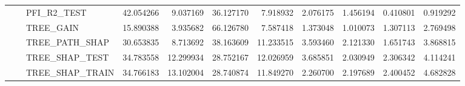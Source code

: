 \begin{table}
\begin{tabular}{lllrrrrrrrr}
 &  & PFI\_R2\_TEST & {\cellcolor[HTML]{B40426}} \color[HTML]{F1F1F1} 42.054266 & {\cellcolor[HTML]{7EA1FA}} \color[HTML]{F1F1F1} 9.037169 & {\cellcolor[HTML]{E26952}} \color[HTML]{F1F1F1} 36.127170 & {\cellcolor[HTML]{7597F6}} \color[HTML]{F1F1F1} 7.918932 & {\cellcolor[HTML]{465ECF}} \color[HTML]{F1F1F1} 2.076175 & {\cellcolor[HTML]{4257C9}} \color[HTML]{F1F1F1} 1.456194 & {\cellcolor[HTML]{3B4CC0}} \color[HTML]{F1F1F1} 0.410801 & {\cellcolor[HTML]{3E51C5}} \color[HTML]{F1F1F1} 0.919292 \\
 &  & TREE\_GAIN & {\cellcolor[HTML]{85A8FC}} \color[HTML]{F1F1F1} 15.890388 & {\cellcolor[HTML]{485FD1}} \color[HTML]{F1F1F1} 3.935682 & {\cellcolor[HTML]{B40426}} \color[HTML]{F1F1F1} 66.126780 & {\cellcolor[HTML]{5977E3}} \color[HTML]{F1F1F1} 7.587418 & {\cellcolor[HTML]{3C4EC2}} \color[HTML]{F1F1F1} 1.373048 & {\cellcolor[HTML]{3B4CC0}} \color[HTML]{F1F1F1} 1.010073 & {\cellcolor[HTML]{3C4EC2}} \color[HTML]{F1F1F1} 1.307113 & {\cellcolor[HTML]{4257C9}} \color[HTML]{F1F1F1} 2.769498 \\
 &  & TREE\_PATH\_SHAP & {\cellcolor[HTML]{EE8669}} \color[HTML]{F1F1F1} 30.653835 & {\cellcolor[HTML]{799CF8}} \color[HTML]{F1F1F1} 8.713692 & {\cellcolor[HTML]{B40426}} \color[HTML]{F1F1F1} 38.163609 & {\cellcolor[HTML]{92B4FE}} \color[HTML]{000000} 11.233515 & {\cellcolor[HTML]{4A63D3}} \color[HTML]{F1F1F1} 3.593460 & {\cellcolor[HTML]{3E51C5}} \color[HTML]{F1F1F1} 2.121330 & {\cellcolor[HTML]{3B4CC0}} \color[HTML]{F1F1F1} 1.651743 & {\cellcolor[HTML]{4C66D6}} \color[HTML]{F1F1F1} 3.868815 \\
 &  & TREE\_SHAP\_TEST & {\cellcolor[HTML]{B40426}} \color[HTML]{F1F1F1} 34.783558 & {\cellcolor[HTML]{A3C2FE}} \color[HTML]{000000} 12.299934 & {\cellcolor[HTML]{EB7D62}} \color[HTML]{F1F1F1} 28.752167 & {\cellcolor[HTML]{A1C0FF}} \color[HTML]{000000} 12.026959 & {\cellcolor[HTML]{4961D2}} \color[HTML]{F1F1F1} 3.685851 & {\cellcolor[HTML]{3B4CC0}} \color[HTML]{F1F1F1} 2.030949 & {\cellcolor[HTML]{3D50C3}} \color[HTML]{F1F1F1} 2.306342 & {\cellcolor[HTML]{4E68D8}} \color[HTML]{F1F1F1} 4.114241 \\
 &  & TREE\_SHAP\_TRAIN & {\cellcolor[HTML]{B40426}} \color[HTML]{F1F1F1} 34.766183 & {\cellcolor[HTML]{AAC7FD}} \color[HTML]{000000} 13.102004 & {\cellcolor[HTML]{EB7D62}} \color[HTML]{F1F1F1} 28.740874 & {\cellcolor[HTML]{9DBDFF}} \color[HTML]{000000} 11.849270 & {\cellcolor[HTML]{3B4CC0}} \color[HTML]{F1F1F1} 2.260700 & {\cellcolor[HTML]{3B4CC0}} \color[HTML]{F1F1F1} 2.197689 & {\cellcolor[HTML]{3C4EC2}} \color[HTML]{F1F1F1} 2.400452 & {\cellcolor[HTML]{516DDB}} \color[HTML]{F1F1F1} 4.682828 \\
\cline{1-11} \cline{2-11}
\bottomrule
\end{tabular}
\end{table}
